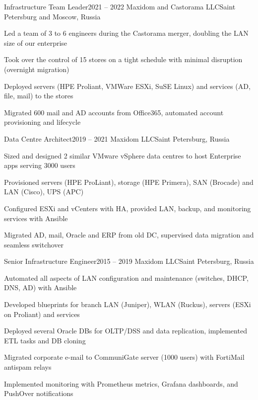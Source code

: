 \expSubHeading
  {Infrastructure Team Leader}{2021 -- 2022}
  {Maxidom and Castorama LLC}{Saint Petersburg and Moscow, Russia}
\begin{zitemize}
\item Led a team of 3 to 6 engineers during the Castorama merger, doubling the LAN size of our enterprise
\item Took over the control of 15 stores on a tight schedule with minimal disruption (overnight migration)
\item Deployed servers (HPE Proliant, VMWare ESXi, SuSE Linux) and services (AD, file, mail) to the stores
\item Migrated 600 mail and AD accounts from Office365, automated account provisioning and lifecycle
\end{zitemize}

\expSubHeading
  {Data Centre Architect}{2019 -- 2021}
  {Maxidom LLC}{Saint Petersburg, Russia}
\begin{zitemize}
\item Sized and designed 2 similar VMware vSphere data centres to host Enterprise apps serving 3000 users
\item Provisioned servers (HPE ProLiant), storage (HPE Primera), SAN (Brocade) and LAN (Cisco), UPS (APC)
\item Configured ESXi and vCenters with HA, provided LAN, backup, and monitoring services with Ansible
\item Migrated AD, mail, Oracle and ERP from old DC, supervised data migration and seamless switchover
\end{zitemize}

\expSubHeading
  {Senior Infrastructure Engineer}{2015 -- 2019}
  {Maxidom LLC}{Saint Petersburg, Russia}
\begin{zitemize}
\item Automated all aspects of LAN configuration and maintenance (switches, DHCP, DNS, AD) with Ansible
\item Developed blueprints for branch LAN (Juniper), WLAN (Ruckus), servers (ESXi on Proliant) and services
\item Deployed several Oracle DBs for OLTP/DSS and data replication, implemented ETL tasks and DB cloning
\item Migrated corporate e-mail to CommuniGate server (1000 users) with FortiMail antispam relays
\item Implemented monitoring with Prometheus metrics, Grafana dashboards, and PushOver notifications
\end{zitemize}

